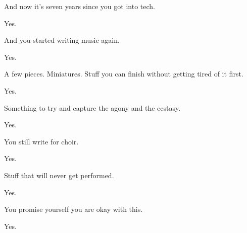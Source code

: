 \begin{paracol}{2}
\begin{leftcolumn}
\begin{ally}
And now it's seven years since you got into tech.
\end{ally}
Yes.

\begin{ally}
And you started writing music again.
\end{ally}
Yes.

\begin{ally}
A few pieces. Miniatures. Stuff you can finish without getting tired of it first.
\end{ally}
Yes.

\begin{ally}
Something to try and capture the agony and the ecstasy.
\end{ally}
Yes.

\begin{ally}
You still write for choir.
\end{ally}
Yes.

\begin{ally}
Stuff that will never get performed.
\end{ally}
Yes.

\begin{ally}
You promise yourself you are okay with this.
\end{ally}
Yes.
\newpage
\end{leftcolumn}
\end{paracol}
